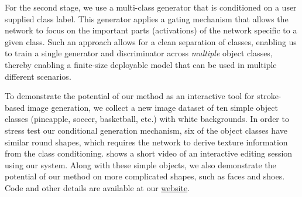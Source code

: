 For the second stage, we use a multi-class generator that is conditioned on a user supplied class label. This generator applies a gating mechanism that allows the network to focus on the important parts (activations) of the network specific to a given class. Such an approach allows for a clean separation of classes, enabling us to train a single generator and discriminator across \emph{multiple} object classes, thereby enabling a finite-size deployable model that can be used in multiple different scenarios. %

To demonstrate the potential of our method as an interactive tool for stroke-based image generation, we collect a new image dataset of ten simple object classes (pineapple, soccer, basketball, etc.) with white backgrounds. In order to stress test our conditional generation mechanism, six of the object classes have similar round shapes, which requires the network to derive texture information from the class conditioning.  shows a short video of an interactive editing session using our system. Along with these simple objects, we also demonstrate the potential of our method on more complicated shapes, such as faces and shoes. Code and other details are available at our \href{https://arnabgho.github.io/iSketchNFill/}{website}.





